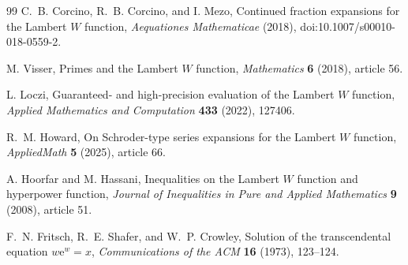 \documentclass[11pt,oneside]{book}
\theoremstyle{definition}
\theoremstyle{remark}
\newcommand{\ee}{\mathrm e}
\begin{document}
\begin{thebibliography}{99}
C.~B. Corcino, R.~B. Corcino, and I. Mezo,
\newblock Continued fraction expansions for the Lambert $W$ function,
\newblock \emph{Aequationes Mathematicae} (2018),
\newblock doi:10.1007/s00010-018-0559-2.

M. Visser,
\newblock Primes and the Lambert $W$ function,
\newblock \emph{Mathematics} \textbf{6} (2018), article 56.

L. Loczi,
\newblock Guaranteed- and high-precision evaluation of the Lambert $W$
function,
\newblock \emph{Applied Mathematics and Computation} \textbf{433} (2022),
127406.

R.~M. Howard,
\newblock On Schroder-type series expansions for the Lambert $W$ function,
\newblock \emph{AppliedMath} \textbf{5} (2025), article 66.

A. Hoorfar and M. Hassani,
\newblock Inequalities on the Lambert $W$ function and hyperpower function,
\newblock \emph{Journal of Inequalities in Pure and Applied Mathematics}
\textbf{9} (2008), article 51.

F.~N. Fritsch, R.~E. Shafer, and W.~P. Crowley,
\newblock Solution of the transcendental equation $w\ee^w=x$,
\newblock \emph{Communications of the ACM} \textbf{16} (1973), 123--124.

\end{thebibliography}
\end{document}
